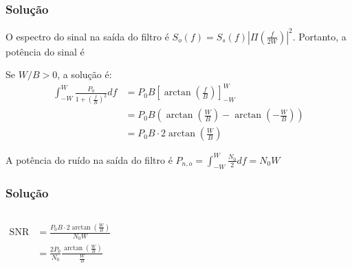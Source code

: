\documentclass[aspectratio=169,dvipsnames]{beamer}
\begin{document}
\begin{frame}
  \frametitle{Solução}

    O espectro do sinal na saída do filtro é
    $S_o(f) = S_s(f) |\Pi \left(\frac{f}{2W}\right)|^2$. Portanto, 
    a potência do sinal é 
    
    Se $W/B > 0$, a solução é:
    \begin{align*}
    \int_{-W}^{W} \frac{P_0}{1 + \left(\frac{f}{B}\right)^2} df &= P_0 B \left[\arctan\left(\frac{f}{B}\right)\right]_{-W}^{W} \\
    &= P_0 B \left(\arctan\left(\frac{W}{B}\right) - \arctan\left(-\frac{W}{B}\right)\right) \\
    &= P_0 B \cdot 2 \arctan\left(\frac{W}{B}\right)
    \end{align*}

    A potência do ruído na saída do filtro é $ P_{n,o} = \int _{-W}^{W} \frac{N_0}{2}df = N_0 W $

\end{frame}


\begin{frame}
  \frametitle{Solução}

  \begin{columns}
    \begin{align*}
      \text{SNR} &= \frac{P_0 B \cdot 2 \arctan\left(\frac{W}{B}\right)}{N_0 W} \\
      &= \frac{2P_0}{N_0} \frac{\arctan\left(\frac{W}{B}\right)}{\frac{W}{B}}
    \end{align*}
    \begin{figure}
      \centering 
  
  
  
    \end{figure}
    \end{columns}    
\end{frame}
\end{document}
